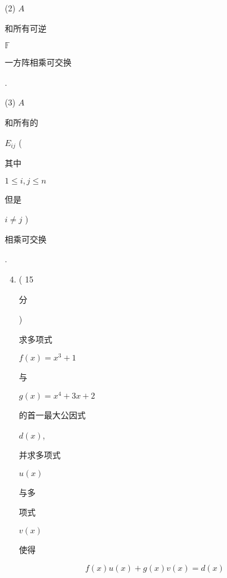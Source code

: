 \documentclass[10pt]{article}
\begin{document}
(2) $A$ \begin{CJK}{UTF8}{mj}和所有可逆\end{CJK} $\mathbb{F}$ \begin{CJK}{UTF8}{mj}一方阵相乘可交换\end{CJK}.

(3) $A$ \begin{CJK}{UTF8}{mj}和所有的\end{CJK} $E_{i j}$ (\begin{CJK}{UTF8}{mj}其中\end{CJK} $1 \leqslant i, j \leqslant n$ \begin{CJK}{UTF8}{mj}但是\end{CJK} $i \neq j$ ) \begin{CJK}{UTF8}{mj}相乘可交换\end{CJK}.

\begin{enumerate}
  \setcounter{enumi}{3}
  \item ( 15 \begin{CJK}{UTF8}{mj}分\end{CJK}) \begin{CJK}{UTF8}{mj}求多项式\end{CJK} $f(x)=x^{3}+1$ \begin{CJK}{UTF8}{mj}与\end{CJK} $g(x)=x^{4}+3 x+2$ \begin{CJK}{UTF8}{mj}的首一最大公因式\end{CJK} $d(x)$, \begin{CJK}{UTF8}{mj}并求多项式\end{CJK} $u(x)$ \begin{CJK}{UTF8}{mj}与多\end{CJK} \begin{CJK}{UTF8}{mj}项式\end{CJK} $v(x)$ \begin{CJK}{UTF8}{mj}使得\end{CJK}
\end{enumerate}
$$
f(x) u(x)+g(x) v(x)=d(x)
$$
\end{document}
